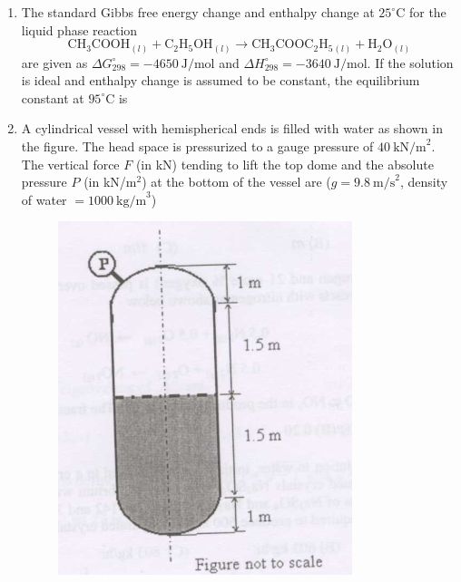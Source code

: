 \documentclass[journal,12pt,onecolumn]{IEEEtran}
\theoremstyle{remark}
\begin{document}
\begin{enumerate}
\item The standard Gibbs free energy change and enthalpy change at $25^\circ$C for the liquid phase reaction
\[
\text{CH}_3\text{COOH}_{(l)} + \text{C}_2\text{H}_5\text{OH}_{(l)} \rightarrow \text{CH}_3\text{COOC}_2\text{H}_5{}_{(l)} + \text{H}_2\text{O}_{(l)}
\]
are given as $\Delta G^\circ_{298} = -4650 \ \text{J/mol}$ and $\Delta H^\circ_{298} = -3640 \ \text{J/mol}$.  
If the solution is ideal and enthalpy change is assumed to be constant, the equilibrium constant at $95^\circ$C is 
\hfill{}
\begin{enumerate}
\end{enumerate}

\item A cylindrical vessel with hemispherical ends is filled with water as shown in the figure. The head space is pressurized to a gauge pressure of $40 \ \text{kN/m}^2$.  
The vertical force $F$ (in kN) tending to lift the top dome and the absolute pressure $P$ (in kN/m$^2$) at the bottom of the vessel are  
($g = 9.8 \ \text{m/s}^2$, density of water $= 1000 \ \text{kg/m}^3$) \begin{figure}[H]
\centering
\includegraphics[width=0.25\columnwidth]{figs/qn37.jpg}
\caption{}
\label{fig:qn37.jpg}
\end{figure} 
\hfill{}
\begin{enumerate}
\end{enumerate}


\end{enumerate}
\end{document}
